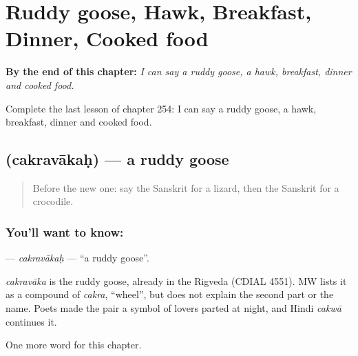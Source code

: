 
\chapter{Ruddy goose, Hawk, Breakfast, Dinner, Cooked food}
\label{ch:sa-ruddy-goose-hawk-breakfast-dinner-cooked-food}

\begin{chapteropening}
\textbf{By the end of this chapter:} \emph{I can say a ruddy goose, a hawk, breakfast, dinner and cooked food.}

Complete the last lesson of chapter 254: I can say a ruddy goose, a hawk, breakfast, dinner and cooked food.
\end{chapteropening}

\section[\texorpdfstring{\sk{चक्रवाकः} (cakravākaḥ)}{चक्रवाकः (cakravākaḥ)}]{ (cakravākaḥ) — a ruddy goose}

\label{lesson:SA-C254-cakravakah}



\begin{quote}
Before the new one: say the Sanskrit for a lizard, then the Sanskrit for a crocodile.
\end{quote}

\subsection*{You'll want to know: }
\textbf{} — \emph{cakravākaḥ} — \textquotedblleft{}a ruddy goose\textquotedblright{}.

\begin{cousinweb}
\emph{cakravāka} is the ruddy goose, already in the Rigveda (CDIAL 4551). MW lists it as a compound of \emph{cakra}, \textquotedblleft{}wheel\textquotedblright{}, but does not explain the second part or the name. Poets made the pair a symbol of lovers parted at night, and Hindi \emph{cakwā} continues it.
\end{cousinweb}

\begin{grammarlens}[title={What you've built}]
One more word for this chapter.
\end{grammarlens}

